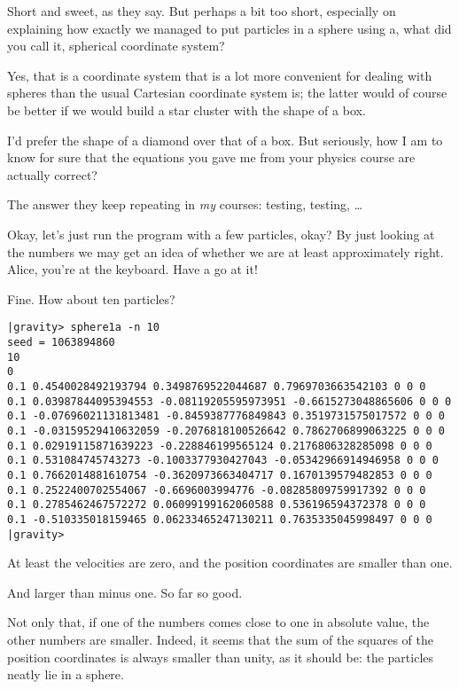 \abc

\bob
Short and sweet, as they say.  But perhaps a bit too short, especially
on explaining how exactly we managed to put particles in a sphere
using a, what did you call it, spherical coordinate system?

\alice
Yes, that is a coordinate system that is a lot more convenient for
dealing with spheres than the usual Cartesian coordinate system is;
the latter would of course be better if we would build a star cluster
with the shape of a box.

\bob
I'd prefer the shape of a diamond over that of a box.  But seriously,
how I am to know for sure that the equations you gave me from your
physics course are actually correct?

\carol
The answer they keep repeating in {\it my} courses: testing, testing, \dots

\bob
Okay, let's just run the program with a few particles, okay?  By just
looking at the numbers we may get an idea of whether we are at least
approximately right.  Alice, you're at the keyboard.  Have a go at it!

\alice
Fine.  How about ten particles?

\cba

\begin{small}
\begin{verbatim}
|gravity> sphere1a -n 10
seed = 1063894860
10
0
0.1 0.4540028492193794 0.3498769522044687 0.7969703663542103 0 0 0
0.1 0.03987844095394553 -0.08119205595973951 -0.6615273048865606 0 0 0
0.1 -0.07696021131813481 -0.8459387776849843 0.3519731575017572 0 0 0
0.1 -0.03159529410632059 -0.2076818100526642 0.7862706899063225 0 0 0
0.1 0.02919115871639223 -0.228846199565124 0.2176806328285098 0 0 0
0.1 0.531084745743273 -0.1003377930427043 -0.05342966914946958 0 0 0
0.1 0.7662014881610754 -0.3620973663404717 0.1670139579482853 0 0 0
0.1 0.2522400702554067 -0.6696003994776 -0.08285809759917392 0 0 0
0.1 0.2785462467572272 0.06099199162060588 0.536196594372378 0 0 0
0.1 -0.510335018159465 0.06233465247130211 0.7635335045998497 0 0 0
|gravity> 
\end{verbatim}
\end{small}

\abc

\bob
At least the velocities are zero, and the position coordinates are
smaller than one.

\carol
And larger than minus one.  So far so good.

\alice
Not only that, if one of the numbers comes close to one in absolute value,
the other numbers are smaller.  Indeed, it seems that the sum of the
squares of the position coordinates is always smaller than unity, as
it should be: the particles neatly lie in a sphere.

